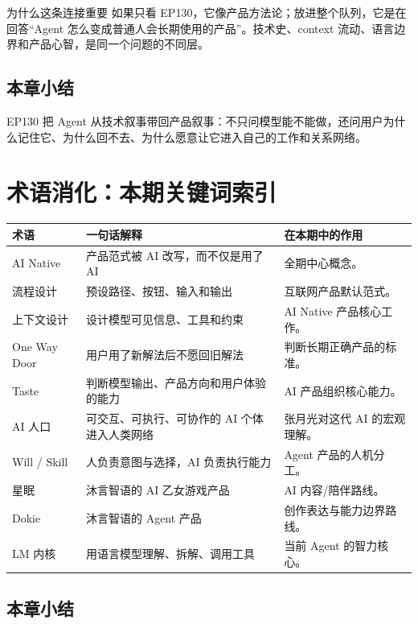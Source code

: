 \documentclass[a4paper]{article}
\begin{document}
\begin{knowledgebox}{为什么这条连接重要}
如果只看 EP130，它像产品方法论；放进整个队列，它是在回答“Agent 怎么变成普通人会长期使用的产品”。技术史、context 流动、语言边界和产品心智，是同一个问题的不同层。
\end{knowledgebox}

\subsection{本章小结}

EP130 把 Agent 从技术叙事带回产品叙事：不只问模型能不能做，还问用户为什么记住它、为什么回不去、为什么愿意让它进入自己的工作和关系网络。

\section{术语消化：本期关键词索引}

\begin{longtable}{p{}p{}p{}}
\toprule
术语 & 一句话解释 & 在本期中的作用 \\
\midrule
AI Native & 产品范式被 AI 改写，而不仅是用了 AI & 全期中心概念。 \\
流程设计 & 预设路径、按钮、输入和输出 & 互联网产品默认范式。 \\
上下文设计 & 设计模型可见信息、工具和约束 & AI Native 产品核心工作。 \\
One Way Door & 用户用了新解法后不愿回旧解法 & 判断长期正确产品的标准。 \\
Taste & 判断模型输出、产品方向和用户体验的能力 & AI 产品组织核心能力。 \\
AI 人口 & 可交互、可执行、可协作的 AI 个体进入人类网络 & 张月光对这代 AI 的宏观理解。 \\
Will / Skill & 人负责意图与选择，AI 负责执行能力 & Agent 产品的人机分工。 \\
星眠 & 沐言智语的 AI 乙女游戏产品 & AI 内容/陪伴路线。 \\
Dokie & 沐言智语的 Agent 产品 & 创作表达与能力边界路线。 \\
LM 内核 & 用语言模型理解、拆解、调用工具 & 当前 Agent 的智力核心。 \\
\bottomrule
\end{longtable}

\subsection{本章小结}
\end{document}
